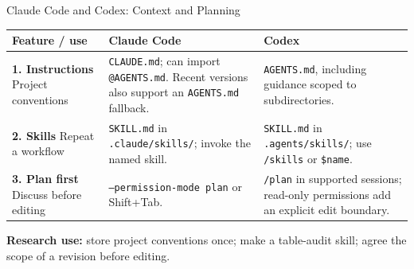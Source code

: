 \begin{frame}{Claude Code and Codex: Context and Planning}
\small
\renewcommand{\arraystretch}{1.22}
\begin{tabular}{>{\raggedright\arraybackslash}p{2.35cm}>{\raggedright\arraybackslash}p{5.1cm}>{\raggedright\arraybackslash}p{5.1cm}}
\toprule
\textbf{Feature / use} & \textbf{Claude Code} & \textbf{Codex} \\
\midrule
\textbf{1. Instructions} \newline Project conventions & \texttt{CLAUDE.md}; can import \texttt{@AGENTS.md}. Recent versions also support an \texttt{AGENTS.md} fallback. & \texttt{AGENTS.md}, including guidance scoped to subdirectories. \\
\textbf{2. Skills} \newline Repeat a workflow & \texttt{SKILL.md} in \texttt{.claude/skills/}; invoke the named skill. & \texttt{SKILL.md} in \texttt{.agents/skills/}; use \texttt{/skills} or \texttt{\$name}. \\
\textbf{3. Plan first} \newline Discuss before editing & \texttt{--permission-mode plan} or Shift+Tab. & \texttt{/plan} in supported sessions; read-only permissions add an explicit edit boundary. \\
\bottomrule
\end{tabular}
\par\vspace{0.25cm}
\normalsize
\textbf{Research use:} store project conventions once; make a table-audit skill; agree the scope of a revision before editing.
\par\vfill
{}
\end{frame}

